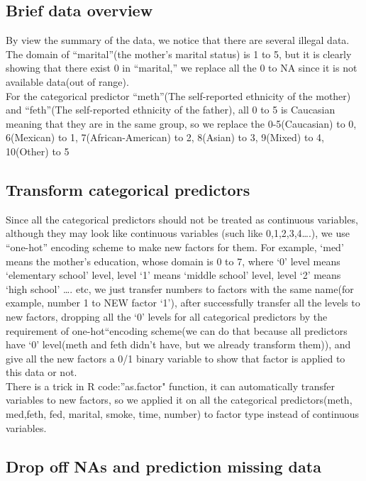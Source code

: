 \documentclass[]{article}
\begin{document}
\subsection{Brief data overview}

By view the summary of the data, we notice that there are several
illegal data. The domain of ``marital''(the mother's marital status) is
1 to 5, but it is clearly showing that there exist 0 in ``marital,'' we
replace all the 0 to NA since it is not available data(out of range).\\
For the categorical predictor ``meth''(The self-reported ethnicity of
the mother) and ``feth''(The self-reported ethnicity of the father), all
0 to 5 is Caucasian meaning that they are in the same group, so we
replace the 0-5(Caucasian) to 0, 6(Mexican) to 1, 7(African-American) to
2, 8(Asian) to 3, 9(Mixed) to 4, 10(Other) to 5

\subsection{Transform categorical predictors}

Since all the categorical predictors should not be treated as continuous
variables, although they may look like continuous variables (such like
0,1,2,3,4\ldots{}.), we use ``one-hot'' encoding scheme to make new
factors for them. For example, `med' means the mother's education, whose
domain is 0 to 7, where `0' level means `elementary school' level, level
`1' means `middle school' level, level `2' means `high school' \ldots{}.
etc, we just transfer numbers to factors with the same name(for example,
number 1 to NEW factor `1'), after successfully transfer all the levels
to new factors, dropping all the `0' levels for all categorical
predictors by the requirement of one-hot``encoding scheme(we can do that
because all predictors have `0' level(meth and feth didn't have, but we
already transform them)), and give all the new factors a 0/1 binary
variable to show that factor is applied to this data or not.\\
There is a trick in R code:''as.factor" function, it can automatically
transfer variables to new factors, so we applied it on all the
categorical predictors(meth, med,feth, fed, marital, smoke, time,
number) to factor type instead of continuous variables.

\subsection{Drop off NAs and prediction missing data}
\end{document}
